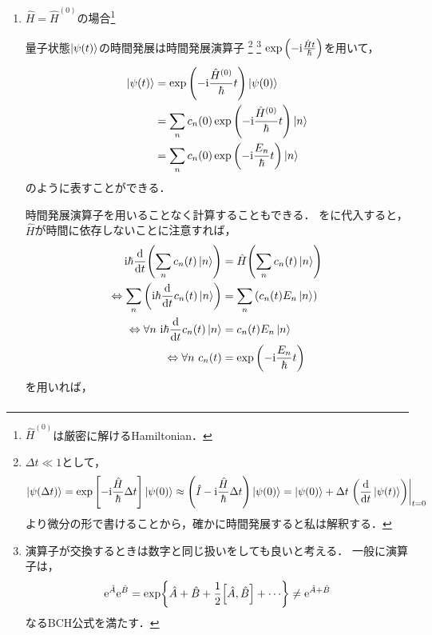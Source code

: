 \documentclass{report}
\begin{document}
  \begin{enumerate}
    \item $\hat{H} = \hat{H}^{(0)}$の場合\footnote{$\hat{H}^{(0)}$は厳密に解けるHamiltonian．}\par
      量子状態$\ket{\psi(t)}$の時間発展は時間発展演算子
      \footnote{
        $\Delta t \ll 1$として，
        \begin{align*}
          \ket{\psi(\Delta t)} = \exp\qty[-\mathrm{i}\frac{\hat{H}}{\hbar}\Delta t]\ket{\psi(0)} \approx\qty(\hat{I} - \mathrm{i}\frac{\hat{H}}{\hbar}\Delta t)\ket{\psi(0)}
          = \ket{\psi(0)} + \Delta t \left.\qty(\dv{t}\ket{\psi(t)})\right|_{t = 0}
        \end{align*}
        より微分の形で書けることから，確かに時間発展すると私は解釈する．}
      \footnote{
        演算子が交換するときは数字と同じ扱いをしても良いと考える．
        一般に演算子は，
        \begin{align*}
          \mathrm{e}^{\hat{A}}\mathrm{e}^{\hat{B}} = \exp{\hat{A} + \hat{B} + \frac{1}{2}\qty[\hat{A},\hat{B}] + \cdots}\neq\mathrm{e}^{\hat{A} + \hat{B}}
        \end{align*}
        なるBCH公式を満たす．
      }
      $\exp\qty(-\mathrm{i}\frac{\hat{H}t}{\hbar})$を用いて，
      \begin{align}
        \ket{\psi(t)} &= \exp\qty(-\mathrm{i}\frac{\hat{H}^{(0)}}{\hbar}t)\ket{\psi(0)} \\
        &= \sum_{n}c_n(0)\exp\qty(-\mathrm{i}\frac{\hat{H}^{(0)}}{\hbar}t)\ket{n} \\
        &= \sum_{n}c_n(0)\exp\qty(-\mathrm{i}\frac{E_n}{\hbar}t)\ket{n}
      \end{align}
      のように表すことができる．
      \par
      時間発展演算子を用いることなく計算することもできる．
      をに代入すると，$\hat{H}$が時間に依存しないことに注意すれば，
      \begin{align}
        \mathrm{i}\hbar\dv{t}\qty(\sum_{n}c_n(t)\ket{n}) &= \hat{H}\qty(\sum_{n}c_n(t)\ket{n}) \label{naive-solution-to-decide-ct}\\ 
        \Leftrightarrow \sum_{n}\qty(\mathrm{i}\hbar\dv{t}c_n(t)\ket{n}) &= \sum_{n}\qty(c_n(t)E_n\ket{n}) \\ 
        \Leftrightarrow \forall n\ \mathrm{i}\hbar\dv{t}c_n(t)\ket{n} &= c_n(t)E_n\ket{n} \\ 
        \Leftrightarrow \forall n\ c_n(t) &= \exp\qty(-\mathrm{i}\frac{E_n}{\hbar}t)
      \end{align}
      を用いれば，
      \begin{align}

\end{align}
\end{enumerate}
\end{document}
